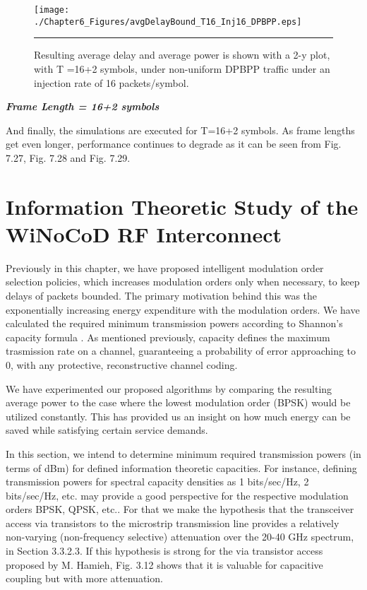 \begin{figure}[H]
  \centering
    \texttt{[image: ./Chapter6\_Figures/avgDelayBound\_T16\_Inj16\_DPBPP.eps]}
    \rule{35em}{0.5pt}
  \caption[Resulting average delay and average power is shown with a 2-y plot, with T =16+2 symbols, under non-uniform DPBPP traffic under an injection rate of 16 packets/symbol.]{Resulting average delay and average power is shown with a 2-y plot, with T =16+2 symbols, under non-uniform DPBPP traffic under an injection rate of 16 packets/symbol.} 
  \label{fig:Electron}
\end{figure} 

\textbf{\textit{Frame Length = 16+2 symbols}}

And finally, the simulations are executed for T=16+2 symbols. As frame lengths get even longer, performance continues to degrade as it can be seen from Fig. 7.27, Fig. 7.28 and Fig. 7.29. 


\section{Information Theoretic Study of the WiNoCoD RF Interconnect}

Previously in this chapter, we have proposed intelligent modulation order selection policies, which increases modulation orders only when necessary, to keep delays of packets bounded. The primary motivation behind this was the exponentially increasing energy expenditure with the modulation orders. We have calculated the required minimum transmission powers according to Shannon's capacity formula \cite{shannon1949mathematical}. As mentioned previously, capacity defines the maximum trasmission rate on a channel, guaranteeing a probability of error approaching to 0, with any protective, reconstructive channel coding. 

We have experimented our proposed algorithms by comparing the resulting average power to the case where the lowest modulation order (BPSK) would be utilized constantly. This has provided us an insight on how much energy can be saved while satisfying certain service demands. 

In this section, we intend to determine minimum required transmission powers (in terms of dBm) for defined information theoretic capacities. For instance, defining transmission powers for spectral capacity densities as 1 bits/sec/Hz, 2 bits/sec/Hz, etc. may provide a good perspective for the respective modulation orders BPSK, QPSK, etc.. For that we make the hypothesis that the transceiver access via transistors to the microstrip transmission line provides a relatively non-varying (non-frequency selective) attenuation over the 20-40 GHz spectrum, in Section 3.3.2.3. If this hypothesis is strong for the via transistor access proposed by M. Hamieh, Fig. 3.12 shows that it is valuable for capacitive coupling but with more attenuation.

